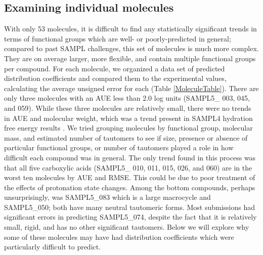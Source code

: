 \subsection{Examining individual molecules}
\label{results:7}
With only 53 molecules, it is difficult to find any statistically significant trends in terms of functional groups which are well- or poorly-predicted in general; compared to past SAMPL challenges, this set of molecules is much more complex. 
They are on average larger, more flexible, and contain multiple functional groups per compound. 
For each molecule, we organized a data set of predicted distribution coefficients and compared them to the experimental values, calculating the average unsigned error for each (Table \ref{MoleculeTable}).
There are only three molecules with an AUE less than 2.0 log units (SAMPL5\_ 003, 045, and 059).
While these three molecules are relatively small, there were no trends in AUE and molecular weight, which was a trend present in SAMPL4 hydration free energy results  \cite{Mobley:2014gu}.
We tried grouping molecules by functional group, molecular mass, and estimated number of tautomers to see if size, presence or absence of particular functional groups, or number of tautomers played a role in how difficult each compound was in general.
The only trend found in this process was that all five carboxylic acids (SAMPL5\_ 010, 011, 015, 026, and 060) are in the worst ten molecules by AUE and RMSE. 
This could be due to poor treatment of the effects of protonation state changes. 
Among the bottom compounds, perhaps unsurprisingly, was SAMPL5\_083 which is a large macrocycle and SAMPL5\_050; both have many neutral tautomeric forms. 
Most submissions had significant errors in predicting SAMPL5\_074, despite the fact that it is relatively small, rigid, and has no other significant tautomers. 
Below we will explore why some of these molecules may have had distribution coefficients which were particularly difficult to predict.

